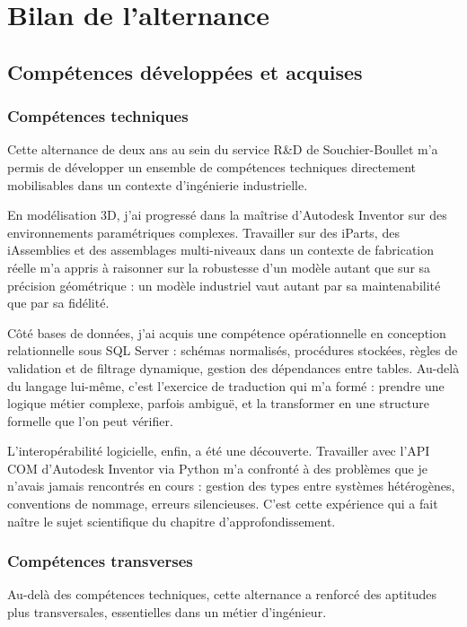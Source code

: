 \chapter{Bilan de l'alternance}

\section{Compétences développées et acquises}

\subsection{Compétences techniques}

Cette alternance de deux ans au sein du service R\&D de Souchier-Boullet m'a permis de développer un ensemble de compétences techniques directement mobilisables dans un contexte d'ingénierie industrielle.

En modélisation 3D, j'ai progressé dans la maîtrise d'Autodesk Inventor sur des environnements paramétriques complexes. Travailler sur des iParts, des iAssemblies et des assemblages multi-niveaux dans un contexte de fabrication réelle m'a appris à raisonner sur la robustesse d'un modèle autant que sur sa précision géométrique : un modèle industriel vaut autant par sa maintenabilité que par sa fidélité.

Côté bases de données, j'ai acquis une compétence opérationnelle en conception relationnelle sous SQL Server : schémas normalisés, procédures stockées, règles de validation et de filtrage dynamique, gestion des dépendances entre tables. Au-delà du langage lui-même, c'est l'exercice de traduction qui m'a formé : prendre une logique métier complexe, parfois ambiguë, et la transformer en une structure formelle que l'on peut vérifier.

L'interopérabilité logicielle, enfin, a été une découverte. Travailler avec l'API COM d'Autodesk Inventor via Python m'a confronté à des problèmes que je n'avais jamais rencontrés en cours : gestion des types entre systèmes hétérogènes, conventions de nommage, erreurs silencieuses. C'est cette expérience qui a fait naître le sujet scientifique du chapitre d'approfondissement.

\subsection{Compétences transverses}

Au-delà des compétences techniques, cette alternance a renforcé des aptitudes plus transversales, essentielles dans un métier d'ingénieur.

